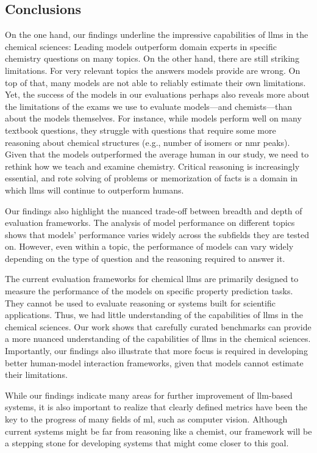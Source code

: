 \documentclass[11pt, oneside]{article}
\begin{document}
\begin{refsection}
\section{Conclusions}
On the one hand, our findings underline the impressive capabilities of \glspl{llm} in the chemical sciences: Leading models outperform domain experts in specific chemistry questions on many topics.
On the other hand, there are still striking limitations.
For very relevant topics the answers models provide are wrong.
On top of that, many models are not able to reliably estimate their own limitations.
Yet, the success of the models in our evaluations perhaps also reveals more about the limitations of the exams we use to evaluate models---and chemists---than about the models themselves.
For instance, while models perform well on many textbook questions, they struggle with questions that require some more reasoning about chemical structures (e.g., number of isomers or \gls{nmr} peaks).
Given that the models outperformed the average human in our study, we need to rethink how we teach and examine chemistry.
Critical reasoning is increasingly essential, and rote solving of problems or memorization of facts is a domain in which \glspl{llm} will continue to outperform humans.

Our findings also highlight the nuanced trade-off between breadth and depth of evaluation frameworks.
The analysis of model performance on different topics shows that models' performance varies widely across the subfields they are tested on.
However, even within a topic, the performance of models can vary widely depending on the type of question and the reasoning required to answer it.

The current evaluation frameworks for chemical \glspl{llm} are primarily designed to measure the performance of the models on specific property prediction tasks.
They cannot be used to evaluate reasoning or systems built for scientific applications.
Thus, we had little understanding of the capabilities of \glspl{llm} in the chemical sciences.
Our work shows that carefully curated benchmarks can provide a more nuanced understanding of the capabilities of \glspl{llm} in the chemical sciences.
Importantly, our findings also illustrate that more focus is required in developing better human-model interaction frameworks, given that models cannot estimate their limitations.

While our findings indicate many areas for further improvement of \gls{llm}-based systems, it is also important to realize that clearly defined metrics have been the key to the progress of many fields of \gls{ml}, such as computer vision.
Although current systems might be far from reasoning like a chemist, our \chembench framework will be a stepping stone for developing systems that might come closer to this goal.


\end{refsection}
\end{document}
